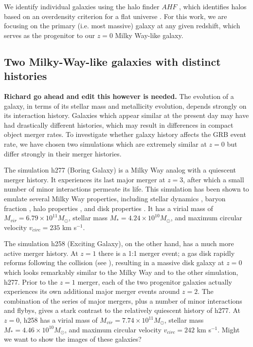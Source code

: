\documentclass[nofootinbib,twocolumn,prd]{emulateapj}
\newcommand\editremark[1]{{\color{red}#1}}
\newcommand\msun{M_\odot}
\begin{document}

We identify individual galaxies using the halo finder $AHF$
\citep{Gill04,Knollman09}, which identifies halos based on an
overdensity criterion for a flat universe \citep{Gross97}.  For this
work, we are focusing on the primary (i.e. most massive) galaxy at any
given redshift, which serves as the progenitor to our $z = 0$ Milky
Way-like galaxy.



\subsection{Two Milky-Way-like galaxies with distinct histories }

{\bf Richard go ahead and edit this however is needed.}  The evolution
of a galaxy, in terms of its stellar mass and metallicity evolution,
depends strongly on its interaction history.  Galaxies which appear
similar at the present day may have had drastically different
histories, which may result in differences in compact object merger
rates.  To investigate whether galaxy history affects the GRB event
rate, we have chosen two simulations which are extremely similar at $z
= 0$ but differ strongly in their merger histories.

The simulation h277 (Boring Galaxy) is a Milky Way analog with a
quiescent merger history.  It experiences its last major merger at $z
= 3$, after which a small number of minor interactions permeate its
life.  This simulation has been shown to emulate several Milky Way
properties, including stellar dynamics
\citep{Loebman12,Loebman14,2014ApJ...790...89K}, baryon fraction
\citep{Munshi13}, halo properties \citep{Zolotov09,Zolotov10}, and
disk properties \citep{Brooks11}.  It has a virial mass of $M_{vir} =
6.79 \times 10^{11} \msun$, stellar mass $M_* = 4.24 \times 10^{10}
\msun$, and maximum circular velocity $v_{circ} = 235$ km s$^{-1}$.

  The simulation h258 (Exciting Galaxy), on the other hand, has a much
  more active merger history.  At $z = 1$ there is a 1:1 merger event;
  a gas disk rapidly reforms following the collision (see
  \citet{Governato09}), resulting in a massive disk galaxy at $z = 0$
  which looks remarkably similar to the Milky Way and to the other
  simulation, h277.  Prior to the $z = 1$ merger, each of the two
  progenitor galaxies actually experiences its own additional major
  merger events around $z = 2$.  The combination of
  the series of major mergers, plus a number of minor interactions and
  flybys, gives a stark contrast to the relatively quiescent history
  of h277.  At $z = 0$, h258 has a virial mass of $M_{vir} = 7.74
  \times 10^{11} \msun$, stellar mass $M_* = 4.46 \times 10^{10}
  \msun$, and maximum circular velocity $v_{circ} = 242$ km s$^{-1}$.  \editremark{Might we want to show the images of these galaxies?}
\end{document}
